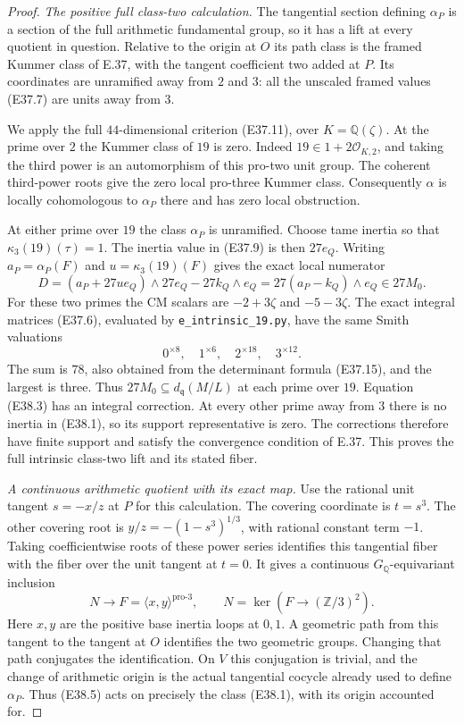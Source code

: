 \begin{proof}
\emph{The positive full class-two calculation.}
The tangential section defining $\alpha_P$ is a section of
the full arithmetic fundamental group, so it has a lift at
every quotient in question. Relative to the origin at $O$
its path class is the framed Kummer class of E.37, with
the tangent coefficient two added at $P$. Its coordinates
are unramified away from $2$ and $3$: all the unscaled
framed values (E37.7) are units away from $3$.

We apply the full $44$-dimensional criterion (E37.11),
over $K=\mathbb Q(\zeta)$. At the prime over $2$ the Kummer
class of $19$ is zero. Indeed $19\in1+2\mathcal O_{K,2}$,
and taking the third power is an automorphism of this
pro-two unit group. The coherent third-power roots give
the zero local pro-three Kummer class. Consequently
$\alpha$ is locally cohomologous to $\alpha_P$ there and
has zero local obstruction.

At either prime over $19$ the class $\alpha_P$ is unramified.
Choose tame inertia so that $\kappa_3(19)(\tau)=1$.
The inertia value in (E37.9) is then $27e_Q$.
Writing $a_P=\alpha_P(F)$ and $u=\kappa_3(19)(F)$ gives
the exact local numerator
\[
 D=(a_P+27u e_Q)\wedge27e_Q-27k_Q\wedge e_Q
   =27(a_P-k_Q)\wedge e_Q\in27M_0.
 \tag{E38.3}
\]
For these two primes the CM scalars are
$-2+3\zeta$ and $-5-3\zeta$.
The exact integral matrices (E37.6), evaluated by
\texttt{e\_intrinsic\_19.py}, have the same Smith
valuations
\[
 0^{\times8},\quad1^{\times6},\quad
 2^{\times18},\quad3^{\times12}.
 \tag{E38.4}
\]
The sum is $78$, also obtained from the determinant
formula (E37.15), and the largest is three.
Thus $27M_0\subseteq d_{\mathfrak q}(M/L)$ at each prime
over $19$. Equation (E38.3) has an integral correction.
At every other prime away from $3$ there is no inertia
in (E38.1), so its support representative is zero.
The corrections therefore have finite support and
satisfy the convergence condition of E.37. This proves
the full intrinsic class-two lift and its stated fiber.

\emph{A continuous arithmetic quotient with its exact map.}
Use the rational unit tangent $s=-x/z$ at $P$ for this
calculation. The covering coordinate is $t=s^3$.
The other covering root is
$y/z=-(1-s^3)^{1/3}$, with rational constant term $-1$.
Taking coefficientwise roots of these power series
identifies this tangential fiber with the fiber over
the unit tangent at $t=0$. It gives a continuous
$G_{\mathbb Q}$-equivariant inclusion
\[
 N\longrightarrow F=\langle x,y\rangle^{\mathrm{pro}\text{-}3},
 \qquad N=\ker(F\longrightarrow(\mathbb Z/3)^2).
 \tag{E38.5}
\]
Here $x,y$ are the positive base inertia loops at $0,1$.
A geometric path from this tangent to the tangent at
$O$ identifies the two geometric groups. Changing that
path conjugates the identification. On $V$ this
conjugation is trivial, and the change of arithmetic
origin is the actual tangential cocycle already used
to define $\alpha_P$. Thus (E38.5) acts on precisely
the class (E38.1), with its origin accounted for.


\end{proof}
